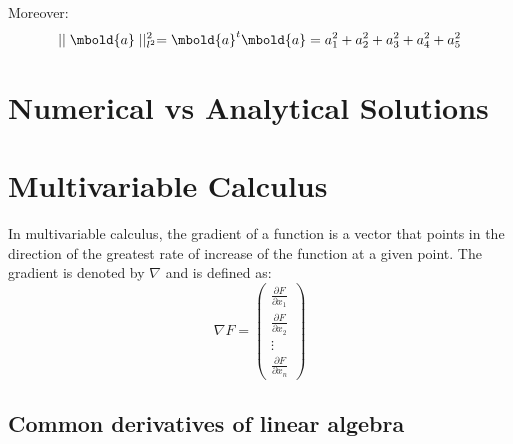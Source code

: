 \documentclass[12pt letter]{report}
\begin{document}
Moreover:
\[
  \mid  \mid \mbold{a}  \mid \mid  ^2_{l^2} = \mbold{a}^t \mbold{a} = a^2_1 + a^2_2 + a^2_3 + a^2_4 + a^2_5
\]

\section{Numerical vs Analytical Solutions}



\section{Multivariable Calculus}

In multivariable calculus, the gradient of a function is a vector that points in the direction of the greatest rate of
increase of the function at a given point. The gradient is denoted by $\nabla$ and is defined as:
\[
  \nabla F = \begin{pmatrix} \frac{\partial F}{\partial x_1} \\ \frac{\partial F}{\partial x_2} \\ \vdots \\ \frac{\partial F}{\partial x_n} \end{pmatrix}
\]

\subsection{Common derivatives of linear algebra} \label{subsec:derivatives}
\end{document}
